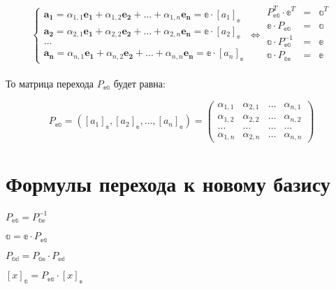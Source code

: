 \begin{equation*} 
	\begin{cases}
		\boldsymbol{a_1} = \alpha_{1,1}\boldsymbol{e_1} + \alpha_{1,2}\boldsymbol{e_2} + \ldots + \alpha_{1,n}\boldsymbol{e_n} = \mathbb{e} \cdot [a_1]_\mathbb{e} \\
		\boldsymbol{a_2} = \alpha_{2,1}\boldsymbol{e_1} + \alpha_{2,2}\boldsymbol{e_2} + \ldots + \alpha_{2,n}\boldsymbol{e_n} = \mathbb{e} \cdot [a_2]_\mathbb{e} \\
		\ldots \\
		\boldsymbol{a_n} = \alpha_{n,1}\boldsymbol{e_1} + \alpha_{n,2}\boldsymbol{e_2} + \ldots + \alpha_{n,n}\boldsymbol{e_n} = \mathbb{e} \cdot [a_n]_\mathbb{e}
	\end{cases}
	\Leftrightarrow
	\begin{matrix}
		P_\mathbb{ea}^T \cdot \mathbb{e}^T& =& \mathbb{a}^T \\
		\mathbb{e} \cdot P_\mathbb{ea}& =& \mathbb{a}\\
		\mathbb{a} \cdot P_\mathbb{ea}^{-1}& =& \mathbb{e}\\
		\mathbb{a} \cdot P_\mathbb{ae}& =& \mathbb{e}\\
	\end{matrix}
\end{equation*} 

То матрица перехода $P_\mathbb{ea}$ будет равна:

\[
P_\mathbb{ea} = 
\left([a_1]_\mathbb{e}, [a_2]_\mathbb{e}, \ldots, [a_n]_\mathbb{e}\right) = 
\begin{pmatrix}
	\alpha_{1,1}& \alpha_{2, 1}& \ldots& \alpha_{n,1}\\
	\alpha_{1,2}& \alpha_{2, 2}& \ldots& \alpha_{n,2}\\
	\ldots& \ldots& \ldots& \ldots\\
	\alpha_{1,n}& \alpha_{2, n}& \ldots& \alpha_{n,n}
\end{pmatrix}
\]

\section{Формулы перехода к новому базису}

$\displaystyle P_\mathbb{ea} = P_\mathbb{ae}^{-1} $

$\displaystyle \mathbb{a} = \mathbb{e} \cdot P_\mathbb{ea} $

$\displaystyle P_\mathbb{ad} = P_\mathbb{ae}\cdot P_\mathbb{ed} $

$\displaystyle [x]_\mathbb{a} = P_\mathbb{ea} \cdot [x]_\mathbb{e} $


